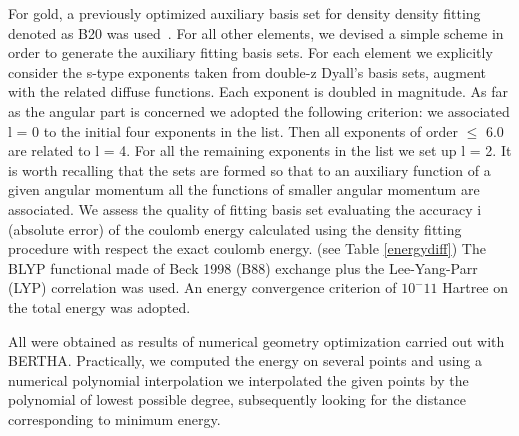 \documentclass[journal=inoraj,manuscript=article]{achemso}
\begin{document}
 For gold, a previously optimized auxiliary basis set for density density fitting denoted as B20 was used~\cite{missedref}. For all other 
 elements, we devised a simple scheme in order to generate the auxiliary fitting basis sets. For each element we explicitly consider 
 the s-type exponents taken from double-z Dyall’s basis sets, augment with the related diffuse functions. Each exponent is doubled in magnitude. 
 As far as the angular part is concerned we adopted the following criterion: we associated l = 0 to the initial four exponents in the  list. Then all 
 exponents of order $\le$ 6.0 are related to l = 4. For all the remaining exponents in the list we set up l = 2.
 It is worth recalling that the sets are formed so that to an auxiliary function of a given angular momentum all the functions of smaller angular momentum 
 are associated. We
 assess the quality of fitting basis set evaluating the accuracy i
 (absolute error) of the coulomb energy calculated using the density fitting procedure 
 with respect the exact coulomb energy. (see Table \ref{energydiff})
The BLYP functional
made of Beck 1998 (B88) exchange \cite{missedref} plus the Lee-Yang-Parr (LYP) correlation \cite{missedref} was used. An energy convergence criterion of $10^-11$
Hartree 
on the total energy was adopted. 

All were obtained as results of numerical geometry optimization carried out with BERTHA. Practically, we computed the energy on several points and using a numerical polynomial  interpolation we interpolated the given points by the polynomial of lowest possible degree, subsequently looking for the distance corresponding to minimum energy. 
\end{document}
